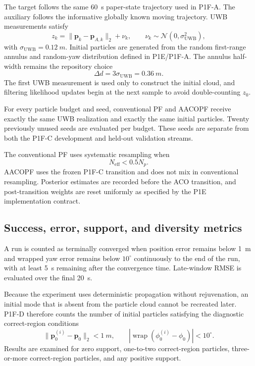 The target follows the same \SI{60}{s} paper-state trajectory used in P1F-A. The auxiliary follows the informative globally known moving trajectory. UWB measurements satisfy
\begin{equation}
    z_k=\lVert \bm p_k-\bm p_{A,k}\rVert_2+\nu_k,
    \qquad
    \nu_k\sim\mathcal N(0,\sigma_{\mathrm{UWB}}^2),
\end{equation}
with $\sigma_{\mathrm{UWB}}=\SI{0.12}{m}$. Initial particles are generated from the random first-range annulus and random-yaw distribution defined in P1E/P1F-A. The annulus half-width remains the repository choice
\begin{equation}
    \Delta d=3\sigma_{\mathrm{UWB}}=\SI{0.36}{m}.
\end{equation}
The first UWB measurement is used only to construct the initial cloud, and filtering likelihood updates begin at the next sample to avoid double-counting $z_0$.

For every particle budget and seed, conventional PF and AACOPF receive exactly the same UWB realization and exactly the same initial particles. Twenty previously unused seeds are evaluated per budget. These seeds are separate from both the P1F-C development and held-out validation streams.

The conventional PF uses systematic resampling when
\begin{equation}
    N_{\mathrm{eff}}<0.5N_p.
\end{equation}
AACOPF uses the frozen P1F-C transition and does not mix in conventional resampling. Posterior estimates are recorded before the ACO transition, and post-transition weights are reset uniformly as specified by the P1E implementation contract.

\subsection{Success, error, support, and diversity metrics}
A run is counted as terminally converged when position error remains below \SI{1}{m} and wrapped yaw error remains below $10^\circ$ continuously to the end of the run, with at least \SI{5}{s} remaining after the convergence time. Late-window RMSE is evaluated over the final \SI{20}{s}.

Because the experiment uses deterministic propagation without rejuvenation, an initial mode that is absent from the particle cloud cannot be recreated later. P1F-D therefore counts the number of initial particles satisfying the diagnostic correct-region conditions
\begin{equation}
    \lVert \bm p_0^{(i)}-\bm p_0\rVert_2<\SI{1}{m},
    \qquad
    |\operatorname{wrap}(\phi_0^{(i)}-\phi_0)|<10^\circ.
\end{equation}
Results are examined for zero support, one-to-two correct-region particles, three-or-more correct-region particles, and any positive support.

